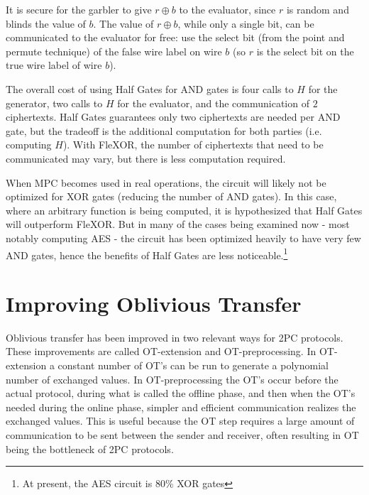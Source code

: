 It is secure for the garbler to give $r \oplus b$ to the evaluator, since $r$ is random and blinds the value of $b$. 
The value of $r \oplus b$, while only a single bit, can be communicated to the evaluator for free: use the select bit (from the point and permute technique) of the false wire label on wire $b$ (so $r$ is the select bit on the true wire label of wire $b$).

The overall cost of using Half Gates for AND gates is four calls to $H$ for the generator, two calls to $H$ for the evaluator, and the communication of $2$ ciphertexts. 
Half Gates guarantees only two ciphertexts are needed per AND gate, but the tradeoff is the additional computation for both parties (i.e. computing $H$).
With FleXOR, the number of ciphertexts that need to be communicated may vary, but there is less computation required.

When MPC becomes used in real operations, the circuit will likely not be optimized for XOR gates (reducing the number of AND gates). 
In this case, where an arbitrary function is being computed, it is hypothesized that Half Gates will outperform FleXOR. 
But in many of the cases being examined now - most notably computing AES - the circuit has been optimized heavily to have very few AND gates, hence the benefits of Half Gates are less noticeable.\footnote{At present, the AES circuit is 80\% XOR gates} 

    \section{Improving Oblivious Transfer}
    Oblivious transfer has been improved in two relevant ways for 2PC protocols. 
    These improvements are called OT-extension and OT-preprocessing. 
    In OT-extension a constant number of OT's can be run to generate a polynomial number of exchanged values.
    In OT-preprocessing the OT's occur before the actual protocol, during what is called the offline phase, and then when the OT's needed during the online phase, simpler and efficient communication realizes the exchanged values.
    This is useful because the OT step requires a large amount of communication to be sent between the sender and receiver, often resulting in OT being the bottleneck of 2PC protocols.


